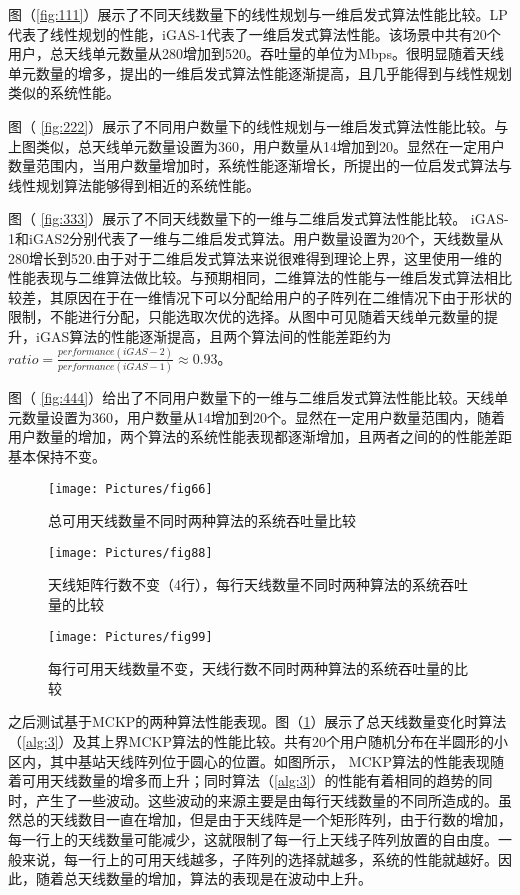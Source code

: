 图（\ref{fig:111}）展示了不同天线数量下的线性规划与一维启发式算法性能比较。LP代表了线性规划的性能，iGAS-1代表了一维启发式算法性能。该场景中共有20个用户，总天线单元数量从280增加到520。吞吐量的单位为Mbps。很明显随着天线单元数量的增多，提出的一维启发式算法性能逐渐提高，且几乎能得到与线性规划类似的系统性能。

图（ \ref{fig:222}）展示了不同用户数量下的线性规划与一维启发式算法性能比较。与上图类似，总天线单元数量设置为360，用户数量从14增加到20。显然在一定用户数量范围内，当用户数量增加时，系统性能逐渐增长，所提出的一位启发式算法与线性规划算法能够得到相近的系统性能。

图（ \ref{fig:333}）展示了不同天线数量下的一维与二维启发式算法性能比较。 iGAS-1和iGAS2分别代表了一维与二维启发式算法。用户数量设置为20个，天线数量从280增长到520.由于对于二维启发式算法来说很难得到理论上界，这里使用一维的性能表现与二维算法做比较。与预期相同，二维算法的性能与一维启发式算法相比较差，其原因在于在一维情况下可以分配给用户的子阵列在二维情况下由于形状的限制，不能进行分配，只能选取次优的选择。从图中可见随着天线单元数量的提升，iGAS算法的性能逐渐提高，且两个算法间的性能差距约为$ratio = \frac{performance(iGAS-2)}{performance(iGAS-1)}\approx 0.93$。

图（ \ref{fig:444}）给出了不同用户数量下的一维与二维启发式算法性能比较。天线单元数量设置为360，用户数量从14增加到20个。显然在一定用户数量范围内，随着用户数量的增加，两个算法的系统性能表现都逐渐增加，且两者之间的的性能差距基本保持不变。

\begin{figure}[htbp]
\centering
\texttt{[image: Pictures/fig66]}
\caption{总可用天线数量不同时两种算法的系统吞吐量比较}
\label{fig:2}
\end{figure}

\begin{figure}[htbp]
\centering
\texttt{[image: Pictures/fig88]}
\caption{天线矩阵行数不变（4行），每行天线数量不同时两种算法的系统吞吐量的比较}
\label{fig:4}
\end{figure}

\begin{figure}[htbp]
\centering
\texttt{[image: Pictures/fig99]}
\caption{每行可用天线数量不变，天线行数不同时两种算法的系统吞吐量的比较}
\label{fig:5}
\end{figure}

之后测试基于MCKP的两种算法性能表现。图（\ref{fig:2}）展示了总天线数量变化时算法（\ref{alg:3}）及其上界MCKP算法的性能比较。共有$20$个用户随机分布在半圆形的小区内，其中基站天线阵列位于圆心的位置。如图所示， MCKP算法的性能表现随着可用天线数量的增多而上升；同时算法（\ref{alg:3}）的性能有着相同的趋势的同时，产生了一些波动。这些波动的来源主要是由每行天线数量的不同所造成的。虽然总的天线数目一直在增加，但是由于天线阵是一个矩形阵列，由于行数的增加，每一行上的天线数量可能减少，这就限制了每一行上天线子阵列放置的自由度。一般来说，每一行上的可用天线越多，子阵列的选择就越多，系统的性能就越好。因此，随着总天线数量的增加，算法的表现是在波动中上升。

